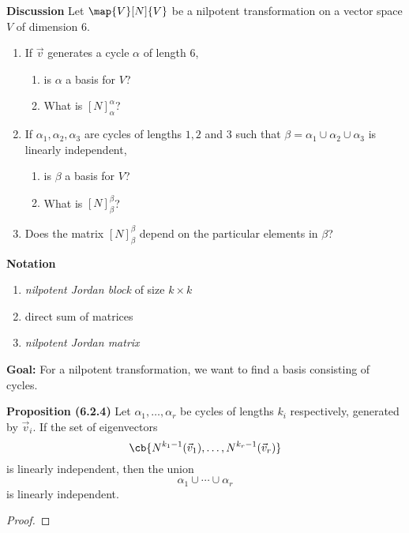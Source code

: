 \documentclass[letterpaper, 10pt]{article}
\begin{document}
\newpage
\lb
\textbf{Discussion}
\lb
Let $\map{V}[N]{V}$ be a nilpotent transformation on a vector space $V$ of dimension $6$.
\begin{enumerate}
    \item If $\vec v$ generates a cycle $α$ of length $6$,
        \begin{enumerate}
            \item is $α$ a basis for $V$?
            \item What is $[N]_α^α$?
        \end{enumerate}
    \item If $α_1, α_2, α_3$ are cycles of lengths $1, 2$ and $3$ such that
        $β = α_1 \cup α_2 \cup α_3$ is linearly independent,
        \begin{enumerate}
            \item is $β$ a basis for $V$?
            \item What is $[N]_β^β$?
        \end{enumerate}

    \item
        Does the matrix $[N]_β^β$ depend on the particular elements in $β$?
\end{enumerate}

\newpage
\lb
\textbf{Notation}
\lb
\begin{enumerate}
    \item \emph{nilpotent Jordan block} of size $k \times k$
    \vspace{150pt}
    \item direct sum of matrices
    \vspace{150pt}
    \item \emph{nilpotent Jordan matrix}
\end{enumerate}



\vspace{150pt}
\lb
\textbf{Goal:} For a nilpotent transformation, we want to find a basis consisting of cycles.
\lb
{}


\newpage
\lb
\textbf{Proposition (6.2.4)}
\lb
Let $α_1, \ldots, α_r$ be cycles of lengths $k_i$ respectively, generated by $\vec v_i$.
If the set of eigenvectors
\[ \cb{N^{k_1 -1} (\vec v_1) , \ldots, N^{k_r -1} (\vec v_r)} \]
is linearly independent, then the union 
\[ α_1 \cup \cdots \cup α_r \]
is linearly independent.
\begin{proof}
\end{proof}
\end{document}

